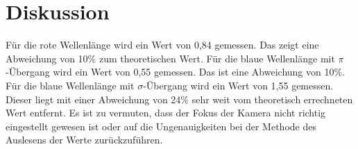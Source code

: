 \section{Diskussion}
\label{sec:Diskussion}
Für die rote Wellenlänge wird ein Wert von 0,84 gemessen. Das zeigt eine Abweichung von 10\% zum theoretischen Wert. Für die blaue Wellenlänge mit $\pi$-Übergang wird ein Wert von 0,55 gemessen. Das ist eine Abweichung von 10\%. Für die blaue Wellenlänge mit $\sigma$-Übergang wird ein Wert von 1,55 gemessen. Dieser liegt mit einer Abweichung von 24\% sehr weit vom theoretisch errechneten Wert entfernt. Es ist zu vermuten, dass der Fokus der Kamera nicht richtig eingestellt gewesen ist oder auf die Ungenauigkeiten bei der Methode des Auslesens der Werte zurückzuführen.
